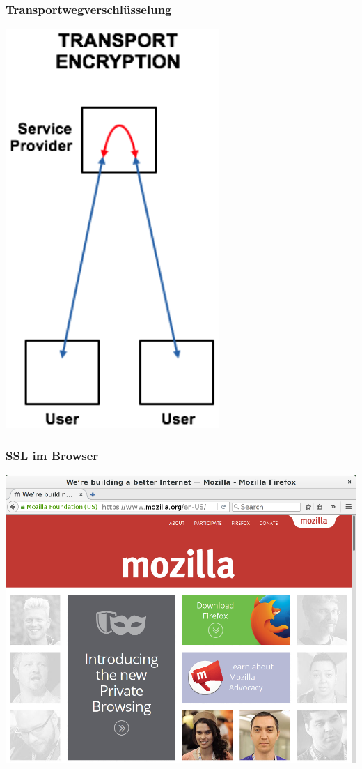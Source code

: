 \begin{frame}
    \frametitle{Transportwegverschlüsselung}
    \begin{center}
      \includegraphics[height=0.8\textheight]{img/enc-transport.png}
    \end{center}
\end{frame}

\begin{frame}
    \frametitle{SSL im Browser}
    \begin{center}
      \includegraphics[height=0.7\textheight]{img/ssl_special.png}
    \end{center}
\end{frame}

